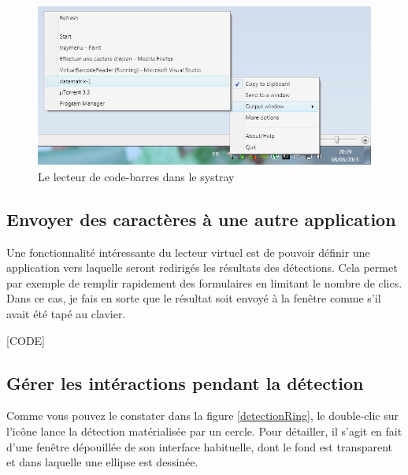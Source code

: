 \begin{figure}
\begin{center}
\includegraphics[scale=0.7]{images/traymenu.png}
\end{center}
\caption{Le lecteur de code-barres dans le systray}
\label{systrayMenu}
\end{figure}

\subsection{Envoyer des caractères à une autre application}

Une fonctionnalité intéressante du lecteur virtuel est de pouvoir définir une application vers laquelle seront redirigés les résultats des détections. Cela permet par exemple de remplir rapidement des formulaires en limitant le nombre de clics. Dans ce cas, je fais en sorte que le résultat soit envoyé à la fenêtre comme s'il avait été tapé au clavier.

[CODE]

\subsection{Gérer les intéractions pendant la détection}

Comme vous pouvez le constater dans la figure \ref{detectionRing}, le double-clic sur l'icône lance la détection matérialisée par un cercle. Pour détailler, il s'agit en fait d'une fenêtre dépouillée de son interface habituelle, dont le fond est transparent et dans laquelle une ellipse est dessinée.


